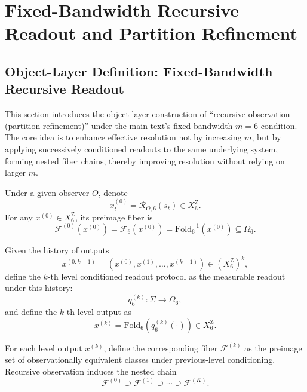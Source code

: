\section{Fixed-Bandwidth Recursive Readout and Partition Refinement}

\subsection{Object-Layer Definition: Fixed-Bandwidth Recursive Readout}

This section introduces the object-layer construction of ``recursive observation (partition refinement)'' under the main text's fixed-bandwidth $m=6$ condition. The core idea is to enhance effective resolution not by increasing $m$, but by applying successively conditioned readouts to the same underlying system, forming nested fiber chains, thereby improving resolution without relying on larger $m$.

\begin{definition}\label{def:recursive-level0}
Under a given observer $O$, denote
$$
x^{(0)}_t=\mathcal{R}_{O,6}(s_t)\in X_6^{\mathrm Z}.
$$
For any $x^{(0)}\in X_6^{\mathrm Z}$, its preimage fiber is
$$
\mathcal{F}^{(0)}(x^{(0)})=\mathcal{F}_6(x^{(0)})=\mathrm{Fold}_6^{-1}(x^{(0)})\subseteq \Omega_6.
$$
\end{definition}

\begin{definition}\label{def:recursive-conditioned-readout}
Given the history of outputs
$$
x^{(0:k-1)}=(x^{(0)},x^{(1)},\dots,x^{(k-1)})\in (X_6^{\mathrm Z})^{k},
$$
define the $k$-th level conditioned readout protocol as the measurable readout under this history:
$$
q_6^{(k)}:\Sigma\to \Omega_6,
$$
and define the $k$-th level output as
$$
x^{(k)}=\mathrm{Fold}_6\!\left(q_6^{(k)}(\cdot)\right)\in X_6^{\mathrm Z}.
$$
\end{definition}

\begin{definition}\label{def:nested-fiber-chain}
For each level output $x^{(k)}$, define the corresponding fiber $\mathcal{F}^{(k)}$ as the preimage set of observationally equivalent classes under previous-level conditioning. Recursive observation induces the nested chain
$$
\mathcal{F}^{(0)}\supseteq \mathcal{F}^{(1)}\supseteq \cdots \supseteq \mathcal{F}^{(K)}.
$$
\end{definition}

